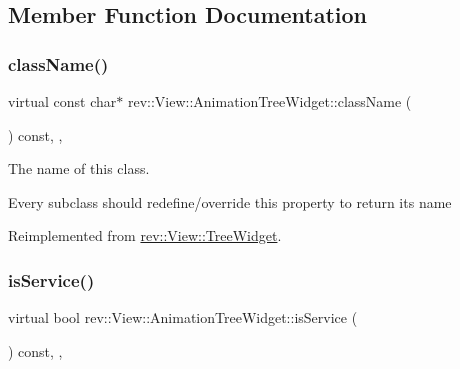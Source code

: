 \subsection{Member Function Documentation}
\mbox{\label{classrev_1_1_view_1_1_animation_tree_widget_aa2b7b831a03e3954d9e37ac361ee7385}} 
\subsubsection{\texorpdfstring{className()}{className()}}
{\footnotesize\ttfamily virtual const char$\ast$ rev\+::\+View\+::\+Animation\+Tree\+Widget\+::class\+Name (\begin{DoxyParamCaption}{ }\end{DoxyParamCaption}) const\hspace{0.3cm}{\ttfamily [inline]}, {\ttfamily [override]}, {\ttfamily [virtual]}}



The name of this class. 

Every subclass should redefine/override this property to return its name 

Reimplemented from \mbox{\hyperlink{classrev_1_1_view_1_1_tree_widget_aedde04f44badced7c60f0e1570e3d0b2}{rev\+::\+View\+::\+Tree\+Widget}}.

\mbox{\label{classrev_1_1_view_1_1_animation_tree_widget_a4c5c6bbdc22bd6f1385eade195ba5364}} 
\subsubsection{\texorpdfstring{isService()}{isService()}}
{\footnotesize\ttfamily virtual bool rev\+::\+View\+::\+Animation\+Tree\+Widget\+::is\+Service (\begin{DoxyParamCaption}{ }\end{DoxyParamCaption}) const\hspace{0.3cm}{\ttfamily [inline]}, {\ttfamily [override]}, {\ttfamily [virtual]}}



